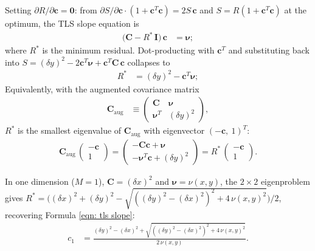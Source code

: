 \documentclass[twoside]{article}
\numberwithin{equation}{section}
\begin{document}
Setting $\partial R/\partial \mathbf{c} = \mathbf{0}$: from $\partial S/\partial \mathbf{c} \cdot (1 + \mathbf{c}^T \mathbf{c}) = 2 S\, \mathbf{c}$ and $S = R (1 + \mathbf{c}^T \mathbf{c})$ at the optimum, the TLS slope equation is
\begin{align}
\label{eqn: multi tls slope}
\bigl( \mathbf{C} - R^*\, \mathbf{I} \bigr)\, \mathbf{c} &= \boldsymbol{\nu};
\end{align}
where $R^*$ is the minimum residual. Dot-producting with $\mathbf{c}^T$ and substituting back into $S = (\delta y)^2 - 2\mathbf{c}^T \boldsymbol{\nu} + \mathbf{c}^T \mathbf{C}\, \mathbf{c}$ collapses to
\begin{align}
\label{eqn: multi tls residual}
R^* &= (\delta y)^2 - \mathbf{c}^T \boldsymbol{\nu};
\end{align}
Equivalently, with the augmented covariance matrix
\begin{align*}
\mathbf{C}_{\mathrm{aug}} &\equiv \begin{pmatrix} \mathbf{C} & \boldsymbol{\nu} \\ \boldsymbol{\nu}^T & (\delta y)^2 \end{pmatrix},
\end{align*}
$R^*$ is the smallest eigenvalue of $\mathbf{C}_{\mathrm{aug}}$ with eigenvector $(-\mathbf{c},\ 1)^T$:
\begin{align*}
\mathbf{C}_{\mathrm{aug}}\, \begin{pmatrix} -\mathbf{c} \\ 1 \end{pmatrix} = \begin{pmatrix} -\mathbf{C}\mathbf{c} + \boldsymbol{\nu} \\ -\boldsymbol{\nu}^T \mathbf{c} + (\delta y)^2 \end{pmatrix} = R^*\, \begin{pmatrix} -\mathbf{c} \\ 1 \end{pmatrix}.
\end{align*}

In one dimension ($M = 1$), $\mathbf{C} = (\delta x)^2$ and $\boldsymbol{\nu} = \nu(x, y)$, the $2 \times 2$ eigenproblem gives $R^* = \bigl( (\delta x)^2 + (\delta y)^2 - \sqrt{((\delta y)^2 - (\delta x)^2)^2 + 4\, \nu(x,y)^2} \bigr)/2$, recovering Formula \eqref{eqn: tls slope}:
\begin{align}
\label{eqn: tls slope}
c_1 &= \frac{(\delta y)^2 - (\delta x)^2 + \sqrt{((\delta y)^2 - (\delta x)^2)^2 + 4\, \nu(x,y)^2}}{2\,\nu(x,y)}.
\end{align}
\end{document}
